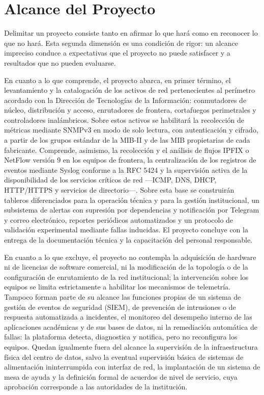 \section{Alcance del Proyecto}
\label{sec:alcance}

Delimitar un proyecto consiste tanto en afirmar lo que hará como en reconocer lo que no hará. Esta segunda dimensión es una condición de rigor: un alcance impreciso conduce a expectativas que el proyecto no puede satisfacer y a resultados que no pueden evaluarse.

En cuanto a lo que comprende, el proyecto abarca, en primer término, el levantamiento y la catalogación de los activos de red pertenecientes al perímetro acordado con la Dirección de Tecnologías de la Información: conmutadores de núcleo, distribución y acceso, enrutadores de frontera, cortafuegos perimetrales y controladores inalámbricos. Sobre estos activos se habilitará la recolección de métricas mediante SNMPv3 en modo de solo lectura, con autenticación y cifrado, a partir de los grupos estándar de la MIB-II y de las MIB propietarias de cada fabricante. Comprende, asimismo, la recolección y el análisis de flujos IPFIX o NetFlow versión 9 en los equipos de frontera, la centralización de los registros de eventos mediante Syslog conforme a la RFC 5424 y la supervisión activa de la disponibilidad de los servicios críticos de red ---ICMP, DNS, DHCP, HTTP/HTTPS y servicios de directorio---. Sobre esta base se construirán tableros diferenciados para la operación técnica y para la gestión institucional, un subsistema de alertas con supresión por dependencias y notificación por Telegram y correo electrónico, reportes periódicos automatizados y un protocolo de validación experimental mediante fallas inducidas. El proyecto concluye con la entrega de la documentación técnica y la capacitación del personal responsable.

En cuanto a lo que excluye, el proyecto no contempla la adquisición de hardware ni de licencias de software comercial, ni la modificación de la topología o de la configuración de enrutamiento de la red institucional; la intervención sobre los equipos se limita estrictamente a habilitar los mecanismos de telemetría. Tampoco forman parte de su alcance las funciones propias de un sistema de gestión de eventos de seguridad (SIEM), de prevención de intrusiones o de respuesta automatizada a incidentes, el monitoreo del desempeño interno de las aplicaciones académicas y de sus bases de datos, ni la remediación automática de fallas: la plataforma detecta, diagnostica y notifica, pero no reconfigura los equipos. Quedan igualmente fuera del alcance la supervisión de la infraestructura física del centro de datos, salvo la eventual supervisión básica de sistemas de alimentación ininterrumpida con interfaz de red, la implantación de un sistema de mesa de ayuda y la definición formal de acuerdos de nivel de servicio, cuya aprobación corresponde a las autoridades de la institución.

